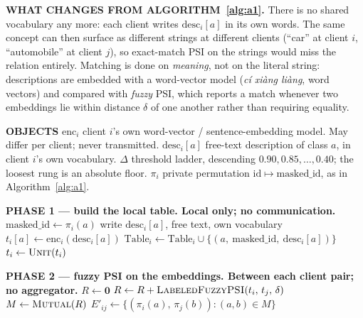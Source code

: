 \documentclass[11pt]{article}
\newcommand{\fps}{\textsc{LabeledFuzzyPSI}}
\newcommand{\mutual}{\textsc{Mutual}}
\newcommand{\unit}{\textsc{Unit}}
\begin{document}
\begin{algorithm}[p]
\caption{Fuzzy description PSI, no shared vocabulary (builds on
         Algorithm~\ref{alg:a1})}
\label{alg:a2}
\footnotesize
{}
\begin{algorithmic}[1]

\Statex \hrulefill
\Statex \textbf{WHAT CHANGES FROM ALGORITHM~\ref{alg:a1}.} There is no shared
        vocabulary any more: each client writes $\mathrm{desc}_i[a]$ in its
        own words. The same concept can then surface as different strings at
        different clients (``car'' at client $i$, ``automobile'' at client
        $j$), so exact-match PSI on the strings would miss the relation
        entirely. Matching is done on \emph{meaning}, not on the literal
        string: descriptions are embedded with a word-vector model
        (\emph{c\'i xi\`ang li\`ang}, word vectors) and compared with
        \emph{fuzzy} PSI, which reports a match whenever two embeddings lie
        within distance $\delta$ of one another rather than requiring
        equality.

\Statex \textbf{OBJECTS}
\Statex \quad $\mathrm{enc}_i$ \quad client $i$'s own word-vector /
        sentence-embedding model. May differ per client; never transmitted.
\Statex \quad $\mathrm{desc}_i[a]$ \quad free-text description of class $a$,
        in client $i$'s own vocabulary.
\Statex \quad $\Delta$ \quad threshold ladder, descending
        $0.90, 0.85, \ldots, 0.40$; the loosest rung is an absolute floor.
\Statex \quad $\pi_i$ \quad private permutation
        $\mathrm{id} \mapsto \mathrm{masked\_id}$, as in
        Algorithm~\ref{alg:a1}.

\Statex \hrulefill
\Statex \textbf{PHASE 1 --- build the local table. Local only; no
        communication.}
    \State $\mathrm{masked\_id} \gets \pi_i(a)$
    \State write $\mathrm{desc}_i[a]$, free text, own vocabulary
    \State $t_i[a] \gets \mathrm{enc}_i(\mathrm{desc}_i[a])$
    \State $\mathrm{Table}_i \gets \mathrm{Table}_i \cup
           \{(a,\ \mathrm{masked\_id},\ \mathrm{desc}_i[a])\}$
  \EndFor
  \State $t_i \gets \unit(t_i)$
\EndFor

\Statex \hrulefill
\Statex \textbf{PHASE 2 --- fuzzy PSI on the embeddings. Between each client
        pair; no aggregator.}
  \State $R \gets \mathbf{0}$
    \State $R \gets R + \fps(t_i,\, t_j,\, \delta)$
  \EndFor
  \State $M \gets \mutual(R)$
  \State $E'_{ij} \gets \{(\pi_i(a),\, \pi_j(b)) : (a,b) \in M\}$
\EndFor


\end{algorithmic}
\end{algorithm}
\end{document}
